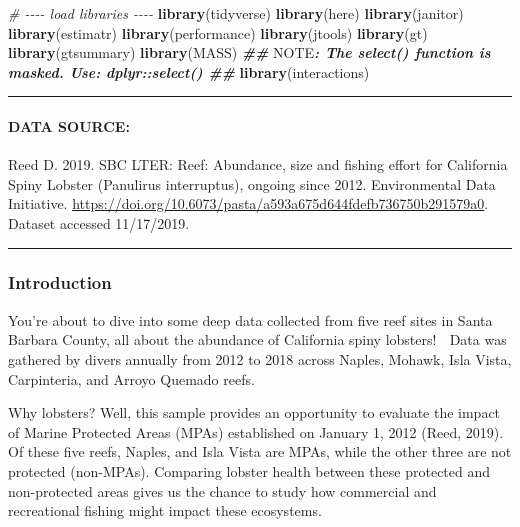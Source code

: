 \documentclass[
]{article}
\newenvironment{Shaded}{\begin{snugshade}}{\end{snugshade}}
\newcommand{\AlertTok}[1]{\textcolor[rgb]{0.94,0.16,0.16}{#1}}
\newcommand{\CommentTok}[1]{\textcolor[rgb]{0.56,0.35,0.01}{\textit{#1}}}
\newcommand{\DocumentationTok}[1]{\textcolor[rgb]{0.56,0.35,0.01}{\textbf{\textit{#1}}}}
\newcommand{\FunctionTok}[1]{\textcolor[rgb]{0.13,0.29,0.53}{\textbf{#1}}}
\newcommand{\NormalTok}[1]{#1}
\begin{document}
\begin{Shaded}
\begin{Highlighting}[]
\CommentTok{\# {-}{-}{-}{-} load libraries {-}{-}{-}{-}}
\FunctionTok{library}\NormalTok{(tidyverse)}
\FunctionTok{library}\NormalTok{(here)}
\FunctionTok{library}\NormalTok{(janitor)}
\FunctionTok{library}\NormalTok{(estimatr)  }
\FunctionTok{library}\NormalTok{(performance)}
\FunctionTok{library}\NormalTok{(jtools)}
\FunctionTok{library}\NormalTok{(gt)}
\FunctionTok{library}\NormalTok{(gtsummary)}
\FunctionTok{library}\NormalTok{(MASS) }\DocumentationTok{\#\# }\AlertTok{NOTE}\DocumentationTok{: The \textasciigrave{}select()\textasciigrave{} function is masked. Use: \textasciigrave{}dplyr::select()\textasciigrave{} \#\#}
\FunctionTok{library}\NormalTok{(interactions) }
\end{Highlighting}
\end{Shaded}

\begin{center}\rule{0.5\linewidth}{0.5pt}\end{center}

\paragraph{DATA SOURCE:}\label{data-source}

Reed D. 2019. SBC LTER: Reef: Abundance, size and fishing effort for
California Spiny Lobster (Panulirus interruptus), ongoing since 2012.
Environmental Data Initiative.
\url{https://doi.org/10.6073/pasta/a593a675d644fdefb736750b291579a0}.
Dataset accessed 11/17/2019.

\begin{center}\rule{0.5\linewidth}{0.5pt}\end{center}

\subsubsection{\texorpdfstring{\textbf{Introduction}}{Introduction}}\label{introduction}

You're about to dive into some deep data collected from five reef sites
in Santa Barbara County, all about the abundance of California spiny
lobsters! 🦞 Data was gathered by divers annually from 2012 to 2018
across Naples, Mohawk, Isla Vista, Carpinteria, and Arroyo Quemado
reefs.

Why lobsters? Well, this sample provides an opportunity to evaluate the
impact of Marine Protected Areas (MPAs) established on January 1, 2012
(Reed, 2019). Of these five reefs, Naples, and Isla Vista are MPAs,
while the other three are not protected (non-MPAs). Comparing lobster
health between these protected and non-protected areas gives us the
chance to study how commercial and recreational fishing might impact
these ecosystems.
\end{document}
